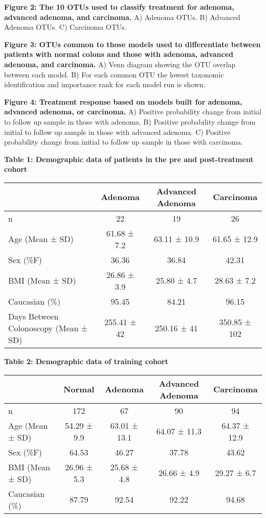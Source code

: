 \documentclass[12pt,]{article}
\begin{document}
\textbf{Figure 2: The 10 OTUs used to classify treatment for adenoma,
advanced adenoma, and carcinoma.} A) Adenoma OTUs. B) Advanced Adenoma
OTUs. C) Carcinoma OTUs.

\textbf{Figure 3: OTUs common to those models used to differentiate
between patients with normal colons and those with adenoma, advanced
adenoma, and carcinoma.} A) Venn diagram showing the OTU overlap between
each model. B) For each common OTU the lowest taxonomic identification
and importance rank for each model run is shown.

\textbf{Figure 4: Treatment response based on models built for adenoma,
advanced adenoma, or carcinoma.} A) Positive probability change from
initial to follow up sample in those with adenoma. B) Positive
probability change from initial to follow up sample in those with
advanced adenoma. C) Positive probability change from initial to follow
up sample in those with carcinoma.

\newpage

\textbf{Table 1: Demographic data of patients in the pre and
post-treatment cohort}

\begin{longtable}[]{@{}lccc@{}}
\toprule
& Adenoma & Advanced Adenoma & Carcinoma\tabularnewline
\midrule
\endhead
n & 22 & 19 & 26\tabularnewline
Age (Mean ± SD) & 61.68 ± 7.2 & 63.11 ± 10.9 & 61.65 ±
12.9\tabularnewline
Sex (\%F) & 36.36 & 36.84 & 42.31\tabularnewline
BMI (Mean ± SD) & 26.86 ± 3.9 & 25.80 ± 4.7 & 28.63 ± 7.2\tabularnewline
Caucasian (\%) & 95.45 & 84.21 & 96.15\tabularnewline
Days Between Colonoscopy (Mean ± SD) & 255.41 ± 42 & 250.16 ± 41 &
350.85 ± 102\tabularnewline
\bottomrule
\end{longtable}

\newpage

\textbf{Table 2: Demographic data of training cohort}

\begin{longtable}[]{@{}lcccc@{}}
\toprule
& Normal & Adenoma & Advanced Adenoma & Carcinoma\tabularnewline
\midrule
\endhead
n & 172 & 67 & 90 & 94\tabularnewline
Age (Mean ± SD) & 54.29 ± 9.9 & 63.01 ± 13.1 & 64.07 ± 11.3 & 64.37 ±
12.9\tabularnewline
Sex (\%F) & 64.53 & 46.27 & 37.78 & 43.62\tabularnewline
BMI (Mean ± SD) & 26.96 ± 5.3 & 25.68 ± 4.8 & 26.66 ± 4.9 & 29.27 ±
6.7\tabularnewline
Caucasian (\%) & 87.79 & 92.54 & 92.22 & 94.68\tabularnewline
\bottomrule
\end{longtable}

\newpage
\end{document}
